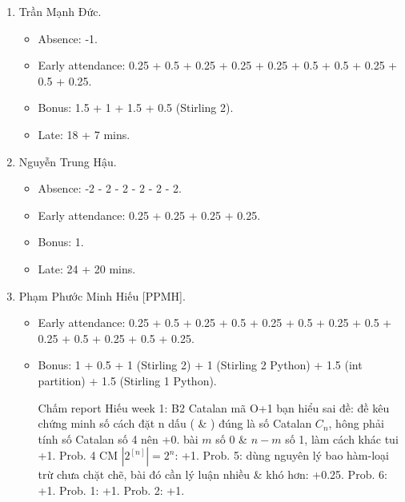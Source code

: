 \documentclass{article}
\begin{document}
\begin{enumerate}
	\item {\sc Trần Mạnh Đức.}
	\begin{itemize}
		\item Absence: -1.
		\item Early attendance: 0.25 + 0.5 + 0.25 + 0.25 + 0.25 + 0.5 + 0.5 + 0.25 + 0.5 + 0.25.
		\item Bonus: 1.5 + 1 + 1.5 + 0.5 (Stirling 2).
		\item Late: 18 + 7 mins.
	\end{itemize}
	\item {\sc Nguyễn Trung Hậu.}
	\begin{itemize}
		\item Absence: -2 - 2 - 2 - 2 - 2 - 2.
		\item Early attendance: 0.25 + 0.25 + 0.25 + 0.25.
		\item Bonus: 1.
		\item Late: 24 + 20 mins.
	\end{itemize}
	\item {\sc Phạm Phước Minh Hiếu [PPMH].}
	\begin{itemize}
		\item Early attendance: 0.25 + 0.5 + 0.25 + 0.5 + 0.25 + 0.5 + 0.25 + 0.5 + 0.25 + 0.5 + 0.25 + 0.5 + 0.25.
		\item Bonus: 1 + 0.5 + 1 (Stirling 2) + 1 (Stirling 2 Python) + 1.5 (int partition) + 1.5 (Stirling 1 Python).		
		
		Chấm report Hiếu week 1: B2 Catalan mã O+1 bạn hiểu sai đề: đề kêu chứng minh số cách đặt n dấu ( \& ) đúng là số Catalan $C_n$, hông phải tính số Catalan số 4 nên +0. bài $m$ số 0 \& $n - m$ số 1, làm cách khác tui +1. Prob. 4 CM $|2^[n]| =2^n$: +1. Prob. 5: dùng nguyên lý bao hàm-loại trừ chưa chặt chẽ, bài đó cần lý luận nhiều \& khó hơn: +0.25. Prob. 6: +1. Prob. 1: +1. Prob. 2: +1.
		

\end{itemize}
\end{enumerate}
\end{document}
